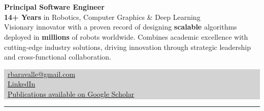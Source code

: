 \documentclass[11pt,a4paper]{article}
\newcommand\crule[3][black]{\textcolor{#1}{\rule{#2}{#3}}}
\begin{document}
\begin{minipage}[c]{0.6\linewidth}
\\ \\
\textbf{Principal Software Engineer }\\
\textbf{14+ Years} in Robotics, Computer Graphics \& Deep Learning\\

\noindent \small{Visionary innovator with a proven record of designing \textbf{scalable} algorithms deployed in \textbf{millions} of robots worldwide. Combines academic excellence with cutting-edge industry solutions, driving innovation through strategic leadership and cross-functional collaboration.}
\end{minipage}
\noindent\colorbox{lightgrey}{%
\begin{minipage}[c]{0.3\linewidth}

\faEnvelope\ \href{mailto:rbaravalle@gmail.com}{rbaravalle@gmail.com}\\
\faLinkedin\ \href{https://www.linkedin.com/in/rodrigo-baravalle/}{LinkedIn}\\
\faGraduationCap\ \href{https://scholar.google.com/citations?hl=es&user=LpMyZmQAAAAJ}{Publications available on Google Scholar}


\end{minipage}}

\vspace{0.25cm}

\crule[headerblue]{18.17cm}{0.5cm}

\vspace{0.25cm}
\end{document}
